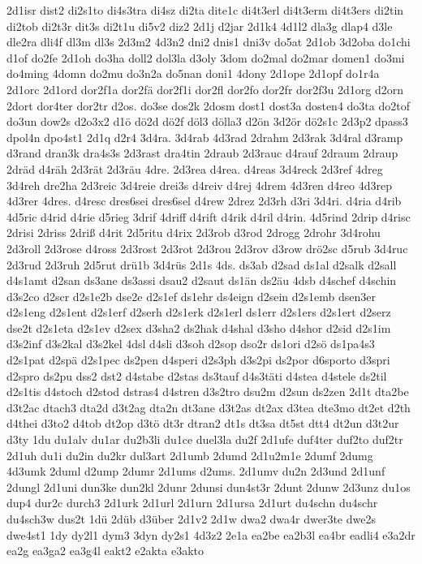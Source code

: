 {2d1isr
dist2
di2s1to
di4s3tra
di4sz
di2ta
dite1c
di4t3erl
di4t3erm
di4t3ers
di2tin
di2tob
di2t3r
dit3s
di2t1u
di5v2
diz2
2d1j
d2jar
2d1k4
4d1l2
dla3g
dlap4
d3le
dle2ra
dli4f
dl3m
dl3s
2d3m2
4d3n2
dni2
dnis1
dni3v
do5at
2d1ob
3d2oba
do1chi
d1of
do2fe
2d1oh
do3ha
doll2
dol3la
d3oly
3dom
do2mal
do2mar
domen1
do3mi
do4ming
4domn
do2mu
do3n2a
do5nan
doni1
4dony
2d1ope
2d1opf
do1r4a
2d1orc
2d1ord
dor2f1a
dor2fä
dor2f1i
dor2fl
dor2fo
dor2fr
dor2f3u
2d1org
d2orn
2dort
dor4ter
dor2tr
d2os.
do3se
dos2k
2dosm
dost1
dost3a
dosten4
do3ta
do2tof
do3un
dow2s
d2o3x2
d1ö
dö2d
dö2f
döl3
dölla3
d2ön
3d2ör
dö2s1c
2d3p2
dpass3
dpol4n
dpo4st1
2d1q
d2r4
3d4ra.
3d4rab
4d3rad
2drahm
2d3rak
3d4ral
d3ramp
d3rand
dran3k
dra4s3s
2d3rast
dra4tin
2draub
2d3rauc
d4rauf
2draum
2draup
2dräd
d4räh
2d3rät
2d3räu
4dre.
2d3rea
d4rea.
d4reas
3d4reck
2d3ref
4dreg
3d4reh
dre2ha
2d3reic
3d4reie
drei3s
d4reiv
d4rej
4drem
4d3ren
d4reo
4d3rep
4d3rer
4dres.
d4resc
dres6sei
dres6sel
d4rew
2drez
2d3rh
d3ri
3d4ri.
d4ria
d4rib
4d5ric
d4rid
d4rie
d5rieg
3drif
4driff
d4rift
d4rik
d4ril
d4rin.
4d5rind
2drip
d4risc
2drisi
2driss
2driß
d4rit
2d5ritu
d4rix
2d3rob
d3rod
2drogg
2drohr
3d4rohu
2d3roll
2d3rose
d4ross
2d3rost
2d3rot
2d3rou
2d3rov
d3row
drö2sc
d5rub
3d4ruc
2d3rud
2d3ruh
2d5rut
drü1b
3d4rüs
2d1s
4ds.
ds3ab
d2sad
ds1al
d2salk
d2sall
d4s1amt
d2san
ds3ane
ds3assi
dsau2
d2saut
ds1än
ds2äu
4dsb
d4schef
d4schin
d3s2co
d2scr
d2s1e2b
dse2e
d2s1ef
ds1ehr
ds4eign
d2sein
d2s1emb
dsen3er
d2s1eng
d2s1ent
d2s1erf
d2serh
d2s1erk
d2s1erl
ds1err
d2s1ers
d2s1ert
d2serz
dse2t
d2s1eta
d2s1ev
d2sex
d3sha2
ds2hak
d4shal
d3sho
d4shor
d2sid
d2s1im
d3s2inf
d3s2kal
d3s2kel
4dsl
d4sli
d3soh
d2sop
dso2r
ds1ori
d2sö
ds1pa4s3
d2s1pat
d2spä
d2s1pec
ds2pen
d4speri
d2s3ph
d3s2pi
ds2por
d6sporto
d3spri
d2spro
ds2pu
dss2
dst2
d4stabe
d2stas
ds3tauf
d4s3täti
d4stea
d4stele
ds2til
d2s1tis
d4stoch
d2stod
dstras4
d4stren
d3s2tro
dsu2m
d2sun
ds2zen
2d1t
dta2be
d3t2ac
dtach3
dta2d
d3t2ag
dta2n
dt3ane
d3t2as
dt2ax
d3tea
dte3mo
dt2et
d2th
d4thei
d3to2
d4tob
dt2op
d3tö
dt3r
dtran2
dt1s
dt3sa
dt5st
dtt4
dt2un
d3t2ur
d3ty
1du
du1alv
du1ar
du2b3li
du1ce
duel3la
du2f
2d1ufe
duf4ter
duf2to
duf2tr
2d1uh
du1i
du2in
du2kr
dul3art
2d1umb
2dumd
2d1u2m1e
2dumf
2dumg
4d3umk
2duml
d2ump
2dumr
2d1ums
d2ums.
2d1umv
du2n
2d3und
2d1unf
2dungl
2d1uni
dun3ke
dun2kl
2dunr
2dunsi
dun4st3r
2dunt
2dunw
2d3unz
du1os
dup4
dur2c
durch3
2d1urk
2d1url
2d1urn
2d1ursa
2d1urt
du4schn
du4schr
du4sch3w
dus2t
1dü
2düb
d3über
2d1v2
2d1w
dwa2
dwa4r
dwer3te
dwe2s
dwe4st1
1dy
dy2l1
dym3
3dyn
dy2s1
4d3z2
2e1a
ea2be
ea2b3l
ea4br
eadli4
e3a2dr
ea2g
ea3ga2
ea3g4l
eakt2
e2akta
e3akto
}
